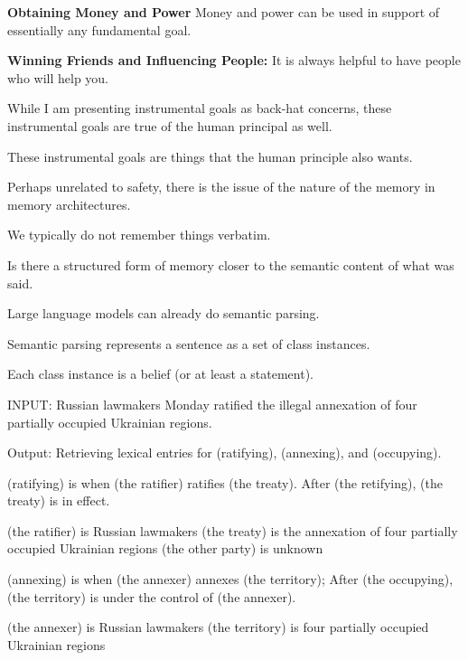 {\vfill
{\bf Obtaining Money and Power} Money and power can be used in support of essentially any fundamental goal.

\vfill
{\bf Winning Friends and Influencing People:}  It is always helpful to have people who will help you.



While I am presenting instrumental goals as back-hat concerns, these instrumental goals are true of the human principal as well.

\vfill
These instrumental goals are things that the human principle also wants.


Perhaps unrelated to safety, there is the issue of the nature of the memory
in memory architectures.

\vfill
We typically do not remember things verbatim.

\vfill
Is there a structured form of memory closer to the semantic content of what was said.


Large language models can already do semantic parsing.

\vfill
Semantic parsing represents a sentence as a set of class instances.

\vfill
Each class instance is a belief (or at least a statement).



INPUT: Russian lawmakers Monday ratified the illegal annexation of four partially occupied Ukrainian regions.

\vfill
Output: Retrieving lexical entries for (ratifying), (annexing), and (occupying).

\vfill
(ratifying) is when (the ratifier) ratifies (the treaty).
After (the retifying), (the treaty) is in effect.

\vfill
(the ratifier) is Russian lawmakers
(the treaty) is the annexation of four partially occupied Ukrainian regions
(the other party) is unknown


(annexing) is when (the annexer) annexes (the territory);
After (the occupying), (the territory) is under the control of (the annexer).

\vfill
(the annexer) is Russian lawmakers
(the territory) is four partially occupied Ukrainian regions

}
